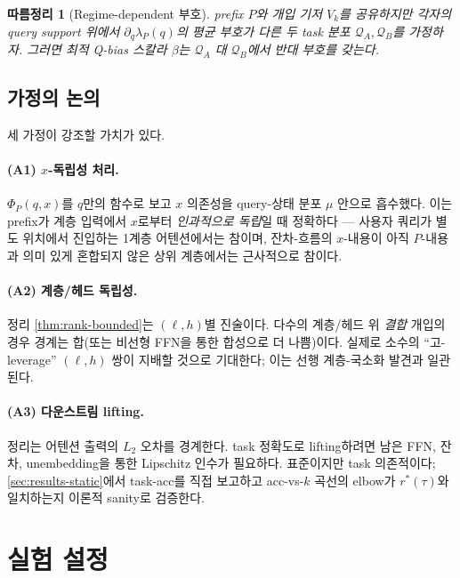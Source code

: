 \documentclass{article}
\newtheorem{corollary}{따름정리}
\theoremstyle{definition}
\newcommand{\Phip}{\Phi_P}
\begin{document}
\begin{corollary}[Regime-dependent 부호]
\label{cor:regime}
prefix $P$와 개입 기저 $V_k$를 공유하지만 각자의 query support 위에서 $\partial_q \lambda_P(q)$의 평균 부호가 다른 두 task 분포 $\mathcal{Q}_A, \mathcal{Q}_B$를 가정하자. 그러면 최적 Q-bias 스칼라 $\beta$는 $\mathcal{Q}_A$ 대 $\mathcal{Q}_B$에서 반대 부호를 갖는다.
\end{corollary}

\subsection{가정의 논의}
\label{sec:assumptions}

세 가정이 강조할 가치가 있다.

\paragraph{(A1) $x$-독립성 처리.}
$\Phip(q,x)$를 $q$만의 함수로 보고 $x$ 의존성을 query-상태 분포 $\mu$ 안으로 흡수했다. 이는 prefix가 계층 입력에서 $x$로부터 \emph{인과적으로 독립}일 때 정확하다 --- 사용자 쿼리가 별도 위치에서 진입하는 1계층 어텐션에서는 참이며, 잔차-흐름의 $x$-내용이 아직 $P$-내용과 의미 있게 혼합되지 않은 상위 계층에서는 근사적으로 참이다.

\paragraph{(A2) 계층/헤드 독립성.}
정리 \ref{thm:rank-bounded}는 $(\ell,h)$별 진술이다. 다수의 계층/헤드 위 \emph{결합} 개입의 경우 경계는 합(또는 비선형 FFN을 통한 합성으로 더 나쁨)이다. 실제로 소수의 ``고-leverage'' $(\ell,h)$ 쌍이 지배할 것으로 기대한다; 이는 선행 계층-국소화 발견과 일관된다.

\paragraph{(A3) 다운스트림 lifting.}
정리는 어텐션 출력의 $L_2$ 오차를 경계한다. task 정확도로 lifting하려면 남은 FFN, 잔차, unembedding을 통한 Lipschitz 인수가 필요하다. 표준이지만 task 의존적이다; \cref{sec:results-static}에서 task-acc를 직접 보고하고 acc-vs-$k$ 곡선의 elbow가 $r^*(\tau)$와 일치하는지 이론적 sanity로 검증한다.

\section{실험 설정}
\label{sec:experiments}
\end{document}
